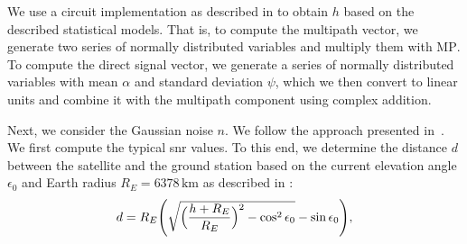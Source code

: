 \documentclass[conference]{IEEEtran}
\newcommand\MP{\ensuremath{\mathrm{MP}}\xspace}
\begin{document}
We use a circuit implementation as described in \cite{DBLP:journals/ijscn/Perez-FontanMMPMMR08} to obtain $h$ based on the described statistical models.
That is, to compute the multipath vector, we generate two series of normally distributed variables and multiply them with \MP.
To compute the direct signal vector, we generate a series of normally distributed variables with mean $\alpha$ and standard deviation $\psi$, which we then convert to linear units and combine it with the multipath component using complex addition.







Next, we consider the Gaussian noise $n$. We follow the approach presented in~\cite{satjscc}. 
We first compute the typical \ac{snr} values. 
To this end, we determine the distance $d$ between the satellite and the ground station based on the current elevation angle $\epsilon_0$ and Earth radius $R_E = 6378\,\textrm{km}$ as described in \cite{7506756}:
%
\begin{equation}
  d = R_E\Biggl(\sqrt{\Bigl(\frac{h + R_E}{R_E}\Bigr)^2 - \cos^{2}\epsilon_{0}} - \sin\epsilon_{0}\Biggr),
\end{equation}
%
\end{document}
